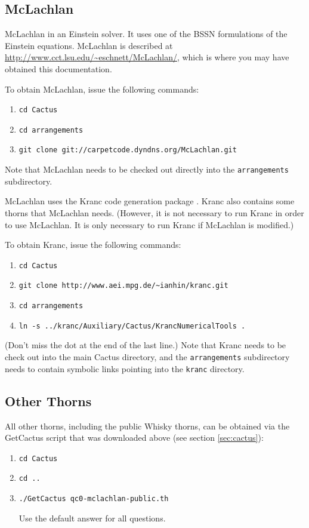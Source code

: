 \documentclass[11pt, tightenlines]{revtex4}
\newcommand{\code}[1]{\texttt{#1}}
\begin{document}
\subsection{McLachlan}

McLachlan \cite{ES-Brown2007b, ES-mclachlanweb} in an Einstein solver.
It uses one of the BSSN formulations of the Einstein equations.
McLachlan is described at
\url{http://www.cct.lsu.edu/~eschnett/McLachlan/}, which is where you
may have obtained this documentation.

To obtain McLachlan, issue the following commands:
\begin{enumerate}
\item\verb+cd Cactus+
\item\verb+cd arrangements+
\item\verb+git clone git://carpetcode.dyndns.org/McLachlan.git+
\end{enumerate}
Note that McLachlan needs to be checked out directly into the
\code{arrangements} subdirectory.

McLachlan uses the Kranc code generation package \cite{kranc04,
  Husa:2004ip, krancweb, ES-krancweb}.  Kranc also contains some
thorns that McLachlan needs.  (However, it is not necessary to run
Kranc in order to use McLachlan.  It is only necessary to run Kranc if
McLachlan is modified.)

To obtain Kranc, issue the following commands:
\begin{enumerate}
\item\verb+cd Cactus+
\item\verb+git clone http://www.aei.mpg.de/~ianhin/kranc.git+
\item\verb+cd arrangements+
\item\verb+ln -s ../kranc/Auxiliary/Cactus/KrancNumericalTools .+
\end{enumerate}
(Don't miss the dot at the end of the last line.)  Note that Kranc
needs to be check out into the main Cactus directory, and the
\code{arrangements} subdirectory needs to contain symbolic links
pointing into the \code{kranc} directory.

\subsection{Other Thorns}

All other thorns, including the public Whisky thorns, can be obtained
via the GetCactus script that was downloaded above (see section
\ref{sec:cactus}):

\begin{enumerate}
\item\verb+cd Cactus+
\item\verb+cd ..+
\item\verb+./GetCactus qc0-mclachlan-public.th+
  
  Use the default answer for all questions.
\end{enumerate}
\end{document}
